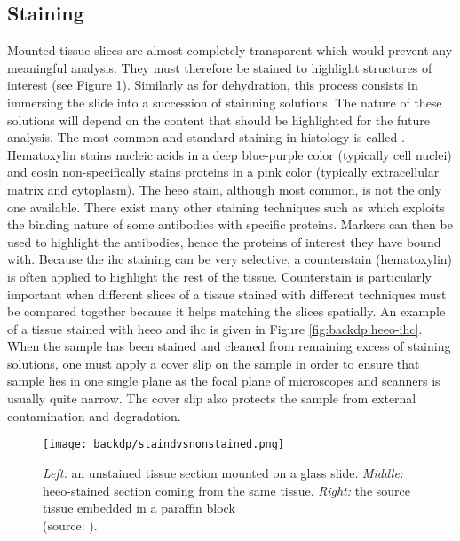 \subsection{Staining}
\label{ssec:backdp:staining}
Mounted tissue slices are almost completely transparent which would prevent any meaningful analysis. They must therefore be stained to highlight structures of interest (see Figure \ref{fig:backdp:stainedvsnonstained}). Similarly as for dehydration, this process consists in immersing the slide into a succession of stainning solutions. The nature of these solutions will depend on the content that should be highlighted for the future analysis. The most common and standard staining in histology is called . Hematoxylin stains nucleic acids in a deep blue-purple color (typically cell nuclei) and eosin non-specifically stains proteins in a pink color (typically extracellular matrix and cytoplasm). The \acrshort{heeo} stain, although most common, is not the only one available. There exist many other staining techniques such as  which exploits the binding nature of some antibodies with specific proteins. Markers can then be used to highlight the antibodies, hence the proteins of interest they have bound with. Because the \acrshort{ihc} staining can be very selective, a counterstain (\eg hematoxylin) is often applied to highlight   the rest of the tissue. Counterstain is particularly important when different slices of a tissue stained with different techniques must be compared together because it helps matching the slices spatially. An example of a tissue stained with \acrshort{heeo} and \acrshort{ihc} is given in Figure \ref{fig:backdp:heeo-ihc}. When the sample has been stained and cleaned from remaining excess of staining solutions, one must apply a cover slip on the sample in order to ensure that sample lies in one single plane as the focal plane of microscopes and scanners is usually quite narrow. The cover slip also protects the sample from external contamination and degradation. 

\begin{figure}
  \centering
  \texttt{[image: backdp/staindvsnonstained.png]}
  \caption{\textit{Left:} an unstained tissue section mounted on a glass slide. \textit{Middle:} \acrshort{heeo}-stained section coming from the same tissue. \textit{Right:} the source tissue embedded in a paraffin block \\ (source: \cite{abbasi2019all}).}
  \label{fig:backdp:stainedvsnonstained}
\end{figure}

